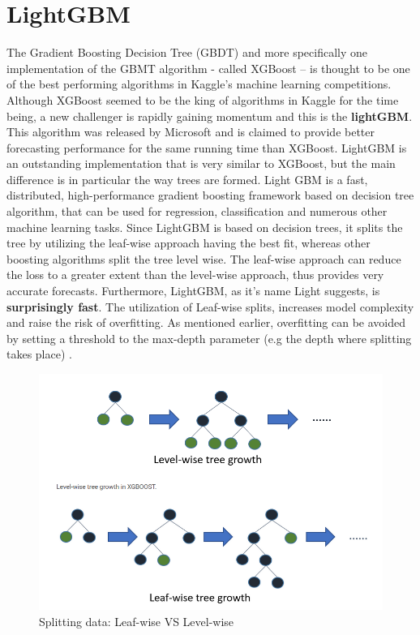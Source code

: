 \section{LightGBM}
The Gradient Boosting Decision Tree (GBDT) and more specifically one implementation of the GBMT algorithm - called XGBoost – is thought to be one of the best performing algorithms in Kaggle's machine learning competitions. Although XGBoost seemed to be the king of algorithms in Kaggle for the time being, a new challenger is rapidly gaining momentum and this is the \textbf{lightGBM}. This algorithm was released by Microsoft and is claimed to provide better forecasting performance for the same running time than XGBoost. LightGBM is an outstanding implementation that is very similar to XGBoost, but the main difference is in particular the way trees are formed. Light GBM is a fast, distributed, high-performance gradient boosting framework based on decision tree algorithm, that can be used for regression, classification and numerous other machine learning tasks. Since LightGBM is based on decision trees, it splits the tree by utilizing the leaf-wise approach having the best fit, whereas other boosting algorithms split the tree level wise. The leaf-wise approach can reduce the loss to a greater extent than the level-wise approach, thus provides very accurate forecasts. Furthermore, LightGBM, as it's name Light suggests, is \textbf{surprisingly fast}.
The utilization of Leaf-wise splits, increases model complexity and raise the risk of overfitting. As mentioned earlier, overfitting can be avoided by setting a threshold to the max-depth parameter (e.g the depth where splitting takes place) \cite{lfl}.

\begin{figure}[htbp]
\centering
\includegraphics[width=0.75\linewidth]{project/LightGBM.PNG}
\caption{ Splitting data: Leaf-wise VS Level-wise}
\label{fig:felix}
\end{figure}


